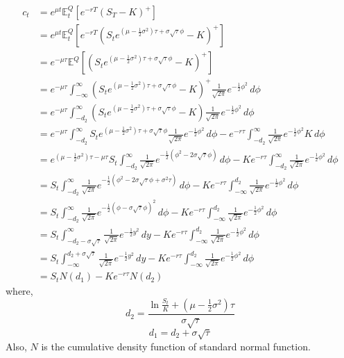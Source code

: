 \begin{equation}
\begin{split}
c_{t} 
&= e^{\mu t}\mathbb{E}_{t}^{Q}[e^{-rT}(S_{T} - K)^{+}]\\
&= e^{\mu t}\mathbb{E}_{t}^{Q}[e^{-rT}(S_{t}e^{(\mu - \frac{1}{2}\sigma^{2})\tau + \sigma\sqrt{\tau}\phi} - K)^{+}]\\
&= e^{-\mu \tau}\mathbb{E}^{Q}[(S_{t}e^{(\mu - \frac{1}{2}\sigma^{2})\tau + \sigma\sqrt{\tau}\phi} - K)^{+}]\\
&= e^{-\mu \tau}\int_{-\infty}^{\infty} (S_{t}e^{(\mu - \frac{1}{2}\sigma^{2})\tau + \sigma\sqrt{\tau}\phi} - K)^{+}\frac{1}{\sqrt{2\pi}}e^{-\frac{1}{2}\phi^{2}}  \, d\phi \\
&= e^{-\mu \tau}\int_{-d_{2}}^{\infty} (S_{t}e^{(\mu - \frac{1}{2}\sigma^{2})\tau + \sigma\sqrt{\tau}\phi} - K)\frac{1}{\sqrt{2\pi}}e^{-\frac{1}{2}\phi^{2}}  \, d\phi \\
&= e^{-\mu \tau}\int_{-d_{2}}^{\infty} S_{t}e^{(\mu - \frac{1}{2}\sigma^{2})\tau + \sigma\sqrt{\tau}\phi}\frac{1}{\sqrt{2\pi}}e^{-\frac{1}{2}\phi^{2}}  \, d\phi - e^{-r\tau}\int_{-d_{2}}^{\infty} \frac{1}{\sqrt{2\pi}}e^{-\frac{1}{2}\phi^{2}}K\, d\phi\\
&= e^{(\mu - \frac{1}{2}\sigma^{2})\tau-\mu \tau}S_{t}\int_{-d_{2}}^{\infty} \frac{1}{\sqrt{2\pi}}e^{-\frac{1}{2}(\phi^{2}-2\sigma\sqrt{\tau}\phi)}  \, d\phi - Ke^{-r\tau}\int_{-d_{2}}^{\infty} \frac{1}{\sqrt{2\pi}}e^{-\frac{1}{2}\phi^{2}}\, d\phi\\
&= S_{t}\int_{-d_{2}}^{\infty} \frac{1}{\sqrt{2\pi}}e^{-\frac{1}{2}(\phi^{2}-2\sigma\sqrt{\tau}\phi+\sigma^{2}\tau)}  \, d\phi - Ke^{-r\tau}\int_{-\infty}^{d_{2}} \frac{1}{\sqrt{2\pi}}e^{-\frac{1}{2}\phi^{2}}\, d\phi\\
&= S_{t}\int_{-d_{2}}^{\infty} \frac{1}{\sqrt{2\pi}}e^{-\frac{1}{2}(\phi-\sigma\sqrt{\tau}\phi)^{2}}  \, d\phi - Ke^{-r\tau}\int_{-\infty}^{d_{2}} \frac{1}{\sqrt{2\pi}}e^{-\frac{1}{2}\phi^{2}}\, d\phi\\
&= S_{t}\int_{-d_{2}-\sigma\sqrt{\tau}}^{\infty} \frac{1}{\sqrt{2\pi}}e^{-\frac{1}{2}y^{2}}  \, dy - Ke^{-r\tau}\int_{-\infty}^{d_{2}} \frac{1}{\sqrt{2\pi}}e^{-\frac{1}{2}\phi^{2}}\, d\phi\\
&= S_{t}\int_{-\infty}^{d_{2}+\sigma\sqrt{\tau}} \frac{1}{\sqrt{2\pi}}e^{-\frac{1}{2}y^{2}}  \, dy - Ke^{-r\tau}\int_{-\infty}^{d_{2}} \frac{1}{\sqrt{2\pi}}e^{-\frac{1}{2}\phi^{2}}\, d\phi\\
&= S_{t} N(d_{1}) - Ke^{-r\tau} N(d_{2})
\end{split}
\end{equation}
where,
$$d_{2} = \frac{\ln{\frac{S_{t}}{K}} + (\mu - \frac{1}{2}\sigma^{2})\tau}{\sigma\sqrt{\tau}}$$
$$d_{1} = d_{2} + \sigma\sqrt{\tau}$$
Also, $N$ is the cumulative density function of standard normal function.
\newpage

